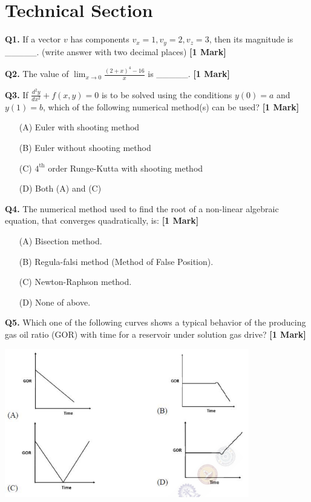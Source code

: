 \documentclass[11pt]{article}
\newcommand{\questiona}[2]{
    \noindent\textbf{Q#2.} #1 \hfill \textbf{[1 Mark]}
}
\begin{document}
\section*{Technical Section}

\questiona{If a vector \( v \) has components \( v_x = 1, v_y = 2, v_z = 3 \), then its magnitude is \_\_\_\_\_. (write answer with two decimal places)}{1}
\vspace{0.5cm}

\questiona{The value of \(\lim_{x \to 0} \frac{(2 + x)^4 - 16}{x}\) is \_\_\_\_\_.}{2}
\vspace{0.5cm}

\questiona{If \(\frac{d^2 y}{dx^2} + f(x, y) = 0\) is to be solved using the conditions \(y(0) = a\) and \(y(1) = b\), which of the following numerical method(s) can be used?}{3}
\begin{enumerate}
    \item[(A)] Euler with shooting method  
    \item[(B)] Euler without shooting method  
    \item[(C)] \(4^{\text{th}}\) order Runge-Kutta with shooting method  
    \item[(D)] Both (A) and (C)  
\end{enumerate}
\vspace{0.5cm}

\questiona{The numerical method used to find the root of a non-linear algebraic equation, that converges quadratically, is:}{4}
\begin{enumerate}
    \item[(A)] Bisection method.  
    \item[(B)] Regula-falsi method (Method of False Position).  
    \item[(C)] Newton-Raphson method.  
    \item[(D)] None of above.  
\end{enumerate}
\vspace{0.5cm}

\questiona{Which one of the following curves shows a typical behavior of the producing gas oil ratio (GOR) with time for a reservoir under solution gas drive?}{5}
\begin{center}
\includegraphics[width=0.8\textwidth]{figures/5.png}
\end{center}
\vspace{0.5cm}
\end{document}
